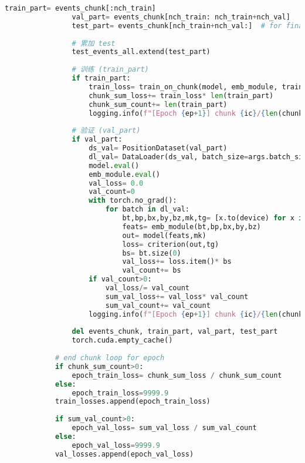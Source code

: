 \begin{lstlisting}[language=Python, caption={模型训练、验证与测试对比脚本 (train\_val\_test\_compare\_v1.py)}, label={lst:train_script}]
                train_part= events_chunk[:nch_train]
                val_part= events_chunk[nch_train: nch_train+nch_val]
                test_part= events_chunk[nch_train+nch_val:]  # for final compare
    
                # 累加 test
                test_events_all.extend(test_part)
    
                # 训练 (train_part)
                if train_part:
                    train_loss= train_on_chunk(model, emb_module, train_part, args.batch_size, criterion, optimizer, device)
                    chunk_sum_loss+= train_loss* len(train_part)
                    chunk_sum_count+= len(train_part)
                    logging.info(f"[Epoch {ep+1}] chunk {ic}/{len(chunk_files_list)} train_loss={train_loss:.4f}, events={len(train_part)}")
    
                # 验证 (val_part)
                if val_part:
                    ds_val= PositionDataset(val_part)
                    dl_val= DataLoader(ds_val, batch_size=args.batch_size, shuffle=False, collate_fn=collate_fn)
                    model.eval()
                    emb_module.eval()
                    val_loss= 0.0
                    val_count=0
                    with torch.no_grad():
                        for batch in dl_val:
                            bt,bp,bx,by,bz,mk,tg= [x.to(device) for x in batch]
                            feats= emb_module(bt,bp,bx,by,bz)
                            out= model(feats,mk)
                            loss= criterion(out,tg)
                            bs= bt.size(0)
                            val_loss+= loss.item()* bs
                            val_count+= bs
                    if val_count>0:
                        val_loss/= val_count
                        sum_val_loss+= val_loss* val_count
                        sum_val_count+= val_count
                    logging.info(f"[Epoch {ep+1}] chunk {ic}/{len(chunk_files_list)} val_loss={val_loss:.4f}, events={val_count}")
    
                del events_chunk, train_part, val_part, test_part
                torch.cuda.empty_cache()
    
            # end chunk loop for epoch
            if chunk_sum_count>0:
                epoch_train_loss= chunk_sum_loss / chunk_sum_count
            else:
                epoch_train_loss=9999.9
            train_losses.append(epoch_train_loss)
    
            if sum_val_count>0:
                epoch_val_loss= sum_val_loss / sum_val_count
            else:
                epoch_val_loss=9999.9
            val_losses.append(epoch_val_loss)
    

\end{lstlisting}
